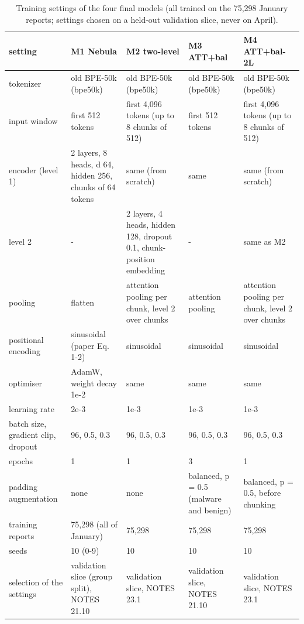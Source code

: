 \begin{table}[t]
\centering
\small
\caption{Training settings of the four final models (all trained on the 75,298 January reports; settings chosen on a held-out validation slice, never on April).}
\label{tab:T2_hyperparameters}
\begin{tabular}{lllll}
\toprule
setting & M1 Nebula & M2 two-level & M3 ATT+bal & M4 ATT+bal-2L \\
\midrule
tokenizer & old BPE-50k (bpe50k) & old BPE-50k (bpe50k) & old BPE-50k (bpe50k) & old BPE-50k (bpe50k) \\
input window & first 512 tokens & first 4,096 tokens (up to 8 chunks of 512) & first 512 tokens & first 4,096 tokens (up to 8 chunks of 512) \\
encoder (level 1) & 2 layers, 8 heads, d 64, hidden 256, chunks of 64 tokens & same (from scratch) & same & same (from scratch) \\
level 2 & - & 2 layers, 4 heads, hidden 128, dropout 0.1, chunk-position embedding & - & same as M2 \\
pooling & flatten & attention pooling per chunk, level 2 over chunks & attention pooling & attention pooling per chunk, level 2 over chunks \\
positional encoding & sinusoidal (paper Eq. 1-2) & sinusoidal & sinusoidal & sinusoidal \\
optimiser & AdamW, weight decay 1e-2 & same & same & same \\
learning rate & 2e-3 & 1e-3 & 1e-3 & 1e-3 \\
batch size, gradient clip, dropout & 96, 0.5, 0.3 & 96, 0.5, 0.3 & 96, 0.5, 0.3 & 96, 0.5, 0.3 \\
epochs & 1 & 1 & 3 & 1 \\
padding augmentation & none & none & balanced, p = 0.5 (malware and benign) & balanced, p = 0.5, before chunking \\
training reports & 75,298 (all of January) & 75,298 & 75,298 & 75,298 \\
seeds & 10 (0-9) & 10 & 10 & 10 \\
selection of the settings & validation slice (group split), NOTES 21.10 & validation slice, NOTES 23.1 & validation slice, NOTES 21.10 & validation slice, NOTES 23.1 \\
\bottomrule
\end{tabular}
\end{table}
